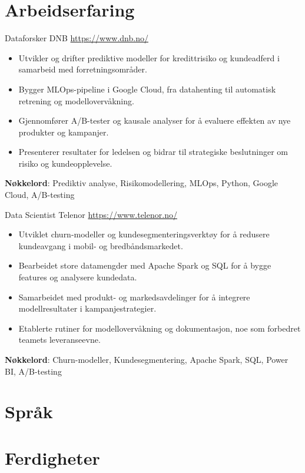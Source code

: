 \documentclass[a4paper, serif, 10pt]{moderncv}
\begin{document}
\section{Arbeidserfaring}

        {Dataforsker}
        {DNB}
        {\url{https://www.dnb.no/}}
        {}
        {\begin{itemize}
\item Utvikler og drifter prediktive modeller for kredittrisiko og kundeadferd i samarbeid med forretningsområder.
\item Bygger MLOps-pipeline i Google Cloud, fra datahenting til automatisk retrening og modellovervåkning.
\item Gjennomfører A/B-tester og kausale analyser for å evaluere effekten av nye produkter og kampanjer.
\item Presenterer resultater for ledelsen og bidrar til strategiske beslutninger om risiko og kundeopplevelse.
\end{itemize}
\textbf{Nøkkelord}: Prediktiv analyse, Risikomodellering, MLOps, Python, Google Cloud, A/B-testing}

        {Data Scientist}
        {Telenor}
        {\url{https://www.telenor.no/}}
        {}
        {\begin{itemize}
\item Utviklet churn-modeller og kundesegmenteringsverktøy for å redusere kundeavgang i mobil- og bredbåndsmarkedet.
\item Bearbeidet store datamengder med Apache Spark og SQL for å bygge features og analysere kundedata.
\item Samarbeidet med produkt- og markedsavdelinger for å integrere modellresultater i kampanjestrategier.
\item Etablerte rutiner for modellovervåkning og dokumentasjon, noe som forbedret teamets leveranseevne.
\end{itemize}
\textbf{Nøkkelord}: Churn-modeller, Kundesegmentering, Apache Spark, SQL, Power BI, A/B-testing}
\section{Språk}

\section{Ferdigheter}
\end{document}
